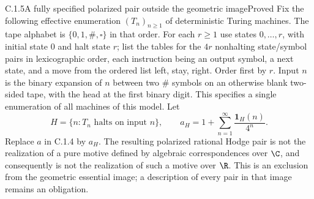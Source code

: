 \begin{result}{C.1.5}{A fully specified polarized pair outside the geometric image}{Proved}
Fix the following effective enumeration $(T_n)_{n\geq1}$ of deterministic Turing machines. The tape alphabet is $\{0,1,\#,\square\}$ in that order. For each $r\geq1$ use states $0,\ldots,r$, with initial state $0$ and halt state $r$; list the tables for the $4r$ nonhalting state/symbol pairs in lexicographic order, each instruction being an output symbol, a next state, and a move from the ordered list left, stay, right. Order first by $r$. Input $n$ is the binary expansion of $n$ between two $\#$ symbols on an otherwise blank two-sided tape, with the head at the first binary digit. This specifies a single enumeration of all machines of this model. Let
\[
 H=\{n:T_n\text{ halts on input }n\},\qquad
 a_H=1+\sum_{n=1}^{\infty}\frac{\mathbf1_H(n)}{4^n}.
\]
Replace $a$ in C.1.4 by $a_H$. The resulting polarized rational Hodge pair is not the realization of a pure motive defined by algebraic correspondences over $\C$, and consequently is not the realization of such a motive over $\R$. This is an exclusion from the geometric essential image; a description of every pair in that image remains an obligation.
\end{result}
